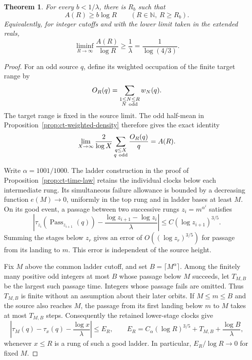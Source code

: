 \documentclass[11pt,a4paper]{article}
\newtheorem{theorem}{Theorem}
\begin{document}
\begin{theorem}\label{thm:ct-raw-occupation-lower}
For every \(b<1/\lambda\), there is \(R_b\) such that
\[
 A(R)\ge b\log R\qquad(R\in\mathbb N,\ R\ge R_b).
\]
Equivalently, for integer cutoffs and with the lower limit taken in the extended reals,
\begin{equation}\label{eq:ct-raw-occupation-lower}
 \liminf_{R\to\infty}\frac{A(R)}{\log R}
       \ge\frac1{\lambda}=\frac1{\log(4/3)}.
\end{equation}
\end{theorem}
\begin{proof}
For an odd source \(q\), define its weighted occupation of the
finite target range by
\[
 O_R(q)=\sum_{\substack{1\le N\le R\\N\ {\rm odd}}}w_N(q).
\]
The target range is fixed in the source limit. The odd half-mean in
Proposition~\ref{prop:ct-weighted-density} therefore gives the exact identity
\begin{equation}\label{eq:ct-raw-occupation-mean}
 \lim_{X\to\infty}\frac2{\log X}
       \sum_{\substack{q\le X\\q\ {\rm odd}}}\frac{O_R(q)}q=A(R).
\end{equation}

Write \(\alpha=1001/1000\). The ladder construction in the proof of
Proposition~\ref{prop:ct-time-law} retains the individual clocks below
each intermediate rung. Its simultaneous failure allowance is bounded
by a decreasing function \(e(M)\to0\), uniformly in the top rung and
in ladder bases at least \(M\). On its good event, a passage between
two successive rungs \(z_i=m^{\alpha^i}\) satisfies
\[
 \left|\tau_{z_i}(\operatorname{Pass}_{z_{i+1}}(q))
       -\frac{\log z_{i+1}-\log z_i}{\lambda}\right|
       \le C(\log z_{i+1})^{3/5}.
\]
Summing the stages below \(z_r\) gives an error of
\(O((\log z_r)^{3/5})\) for passage from its landing to \(m\).
This error is independent of the source height.

Fix \(M\) above the common ladder cutoff, and set
\(B=\lceil M^\alpha\rceil\). Among the finitely many positive odd
integers at most \(B\) whose passage below \(M\)
succeeds, let \(T_{M,B}\) be the largest such passage time. Integers
whose passage fails are omitted. Thus \(T_{M,B}\) is finite without
an assumption about their later orbits. If \(M\le m\le B\) and
the source also reaches \(M\), the passage from its first landing
below \(m\) to \(M\) takes at most \(T_{M,B}\) steps. Consequently
the retained lower-stage clocks give
\begin{equation}\label{eq:ct-raw-intermediate-clock}
 \left|\tau_M(q)-\tau_x(q)-\frac{\log x}{\lambda}\right|
       \le E_R,\qquad
 E_R=C_\alpha(\log R)^{3/5}+T_{M,B}+\frac{\log B}{\lambda},
\end{equation}
whenever \(x\le R\) is a rung of such a good ladder. In particular,
\(E_R/\log R\to0\) for fixed \(M\).


\end{proof}
\end{document}
